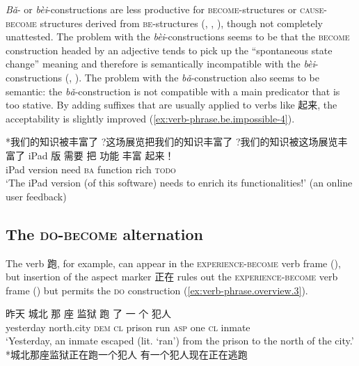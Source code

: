 \documentclass[UTF8, a4paper, oneside, scheme=plain, 12pt]{ctexrep}
\newcommand{\form}[1]{\emph{#1}}
\newcommand{\translate}[1]{`#1'}
\newcommand*{\category}[1]{\textsc{#1}}
\begin{document}
\form{Bǎ}- or \form{bèi}-constructions are less productive 
for \category{become}-structures or \category{cause}-\category{become} structures 
derived from \category{be}-structures 
(,
,
),
though not completely unattested.
The problem with the \form{bèi}-constructions
seems to be that the \category{become} construction 
headed by an adjective tends to pick up the 
``spontaneous state change'' meaning 
and therefore is semantically incompatible with 
the \form{bèi}-constructions
(,
).
The problem with the \form{bǎ}-construction 
also seems to be semantic:
the \form{bǎ}-construction is not compatible with 
a main predicator that is too stative. 
By adding suffixes that are usually applied to verbs like 起来, 
the acceptability is slightly improved 
(\ref{ex:verb-phrase.be.impossible-4}).

\begin{exe}
    \ex\label{ex:verb-phrase.be.impossible-1} *我们的知识被丰富了
    \ex\label{ex:verb-phrase.be.impossible-2} ?这场展览把我们的知识丰富了
    \ex\label{ex:verb-phrase.be.impossible-3} ?我们的知识被这场展览丰富了
    \ex\label{ex:verb-phrase.be.impossible-4}
    \gll  iPad 版 需要 把 功能 丰富 起来！\\ 
    iPad version need \category{ba} function rich \category{todo} \\ 
    \glt \translate{The iPad version (of this software) needs to enrich its functionalities!} 
    (an online user feedback)
\end{exe}

\subsection{The \category{do}-\category{become} alternation}\label{sec:ver-phrase.gei}

The verb 跑, for example, 
can appear in the \category{experience}-\category{become} verb frame  
(), 
but insertion of the aspect marker 正在 
rules out the \category{experience}-\category{become} verb frame 
()
but permits the \category{do} construction 
(\ref{ex:verb-phrase.overview.3}).

\begin{exe}
    \ex\label{ex:verb-phrase.overview.1} \gll 昨天 城北 那 座 监狱 跑 了 一 个 犯人 \\
    yesterday north.city \category{dem} \category{cl} prison run \category{asp} one \category{cl} inmate \\
    \glt \translate{Yesterday, an inmate escaped (lit. `ran') from the prison to the north of the city.} 
    \ex\label{ex:verb-phrase.overview.2} *城北那座监狱正在跑一个犯人
    \ex\label{ex:verb-phrase.overview.3} 有一个犯人现在正在逃跑
\end{exe}
\end{document}
